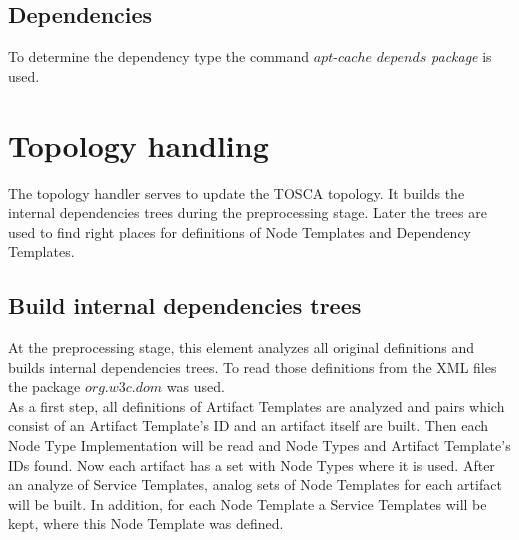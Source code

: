 \subsection*{Dependencies}
To determine the dependency type the command $apt$-$cache$ $depends$ \emph{package} is used.

\section{Topology handling}\label{sec:imptophan}
The topology handler serves to update the TOSCA topology.
It builds the internal dependencies trees during the preprocessing stage.
Later the trees are used to find right places for definitions of Node Templates and Dependency Templates.

\subsection*{Build internal dependencies trees}
At the preprocessing stage, this element analyzes all original definitions and builds internal dependencies trees. %
To read those definitions from the XML files the package $org$.$w3c$.$dom$ was used.\\
As a first step, all definitions of Artifact Templates are analyzed and pairs which consist of an Artifact Template's ID and an artifact itself are built.
Then each Node Type Implementation will be read and Node Types and Artifact Template's IDs found. 
Now each artifact has a set with Node Types where it is used.
After an analyze of Service Templates, analog sets of Node Templates for each artifact will be built. 
In addition, for each Node Template a Service Templates will be kept, where this Node Template was defined.	

